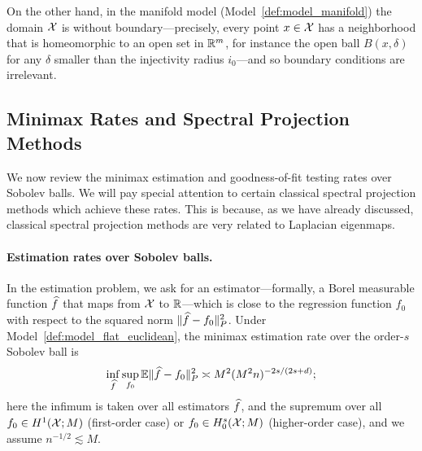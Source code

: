 On the other hand, in the manifold model (Model~\ref{def:model_manifold}) the domain $\mathcal{X}$ is without boundary---precisely, every point $x \in \mathcal{X}$ has a neighborhood that is homeomorphic to an open set in $\mathbb{R}^m$, for instance the open ball $B(x,\delta)$ for any $\delta$ smaller than the injectivity radius $i_0$---and so boundary conditions are irrelevant. 

\subsection{Minimax Rates and Spectral Projection Methods}
\label{subsec:minimax_rates_sobolev}
We now review the minimax estimation and goodness-of-fit testing rates over Sobolev balls. We will pay special attention to certain classical spectral projection methods which achieve these rates. This is because, as we have already discussed, classical spectral projection methods are very related to Laplacian eigenmaps.

\paragraph{Estimation rates over Sobolev balls.}
In the estimation problem, we ask for an estimator---formally, a Borel measurable function $\widehat{f}$ that maps from $\mathcal{X}$ to $\mathbb{R}$---which is close to the regression function $f_0$ with respect to the squared norm $\|\widehat{f} - f_0\|_{P}^2$. Under Model~\ref{def:model_flat_euclidean}, the minimax estimation rate over the order-$s$ Sobolev ball is
\begin{equation}
\label{eqn:sobolev_space_minimax_estimation_rate}
\inf_{\widehat{f}} \sup_{f_0} \mathbb{E}\|\widehat{f} - f_0\|_P^2 \asymp M^2(M^2n)^{-2s/(2s + d)};
\end{equation}
here the infimum is taken over all estimators $\widehat{f}$, and the supremum over all $f_0 \in H^1(\mathcal{X};M)$ (first-order case) or $f_0 \in H_0^s(\mathcal{X};M)$ (higher-order case), and we assume $n^{-1/2} \lesssim M$.

